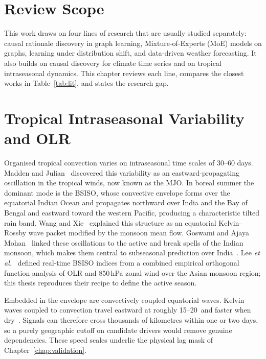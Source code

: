 \label{chap:lit}

\section{Review Scope}
\label{sec:lit-scope}

This work draws on four lines of research that are usually studied separately: causal rationale discovery in graph learning, Mixture-of-Experts (MoE) models on graphs, learning under distribution shift, and data-driven weather forecasting. It also builds on causal discovery for climate time series and on tropical intraseasonal dynamics. This chapter reviews each line, compares the closest works in Table~\ref{tab:lit}, and states the research gap.

\section{Tropical Intraseasonal Variability and OLR}
\label{sec:lit-bsiso}

Organised tropical convection varies on intraseasonal time scales of 30--60 days. Madden and Julian~\cite{madden1971detection} discovered this variability as an eastward-propagating oscillation in the tropical winds, now known as the MJO. In boreal summer the dominant mode is the BSISO, whose convective envelope forms over the equatorial Indian Ocean and propagates northward over India and the Bay of Bengal and eastward toward the western Pacific, producing a characteristic tilted rain band. Wang and Xie~\cite{wang1997model} explained this structure as an equatorial Kelvin--Rossby wave packet modified by the monsoon mean flow. Goswami and Ajaya Mohan~\cite{goswami2001intraseasonal} linked these oscillations to the active and break spells of the Indian monsoon, which makes them central to subseasonal prediction over India~\cite{vitart2017s2s}. Lee \emph{et al.}~\cite{lee2013realtime} defined real-time BSISO indices from a combined empirical orthogonal function analysis of OLR and 850\,hPa zonal wind over the Asian monsoon region; this thesis reproduces their recipe to define the active season.

Embedded in the envelope are convectively coupled equatorial waves. Kelvin waves coupled to convection travel eastward at roughly 15--20\ms\ and faster when dry~\cite{kiladis2009convectively}. Signals can therefore cross thousands of kilometres within one or two days, so a purely geographic cutoff on candidate drivers would remove genuine dependencies. These speed scales underlie the physical lag mask of Chapter~\ref{chap:validation}.

